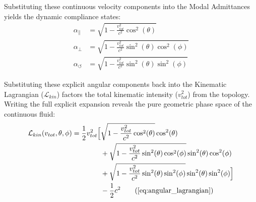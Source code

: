 \documentclass[11pt, a4paper]{article}
\begin{document}
Substituting these continuous velocity components into the Modal Admittances yields the dynamic compliance states:
\begin{align}
    \alpha_{\parallel} &= \sqrt{1 - \frac{v_{tot}^2}{c^2} \cos^2(\theta)} \nonumber \\
    \alpha_{\perp} &= \sqrt{1 - \frac{v_{tot}^2}{c^2} \sin^2(\theta)\cos^2(\phi)} \nonumber \\
    \alpha_{\circlearrowleft} &= \sqrt{1 - \frac{v_{tot}^2}{c^2} \sin^2(\theta)\sin^2(\phi)} \nonumber
\end{align}

Substituting these explicit angular components back into the Kinematic Lagrangian ($\mathcal{L}_{kin}$) factors the total kinematic intensity ($v_{tot}^2$) from the topology. Writing the full explicit expansion reveals the pure geometric phase space of the continuous fluid:
\begin{align}
    \mathcal{L}_{kin}(v_{tot}, \theta, \phi) = \frac{1}{2} v_{tot}^2 \Big[ &\sqrt{1 - \frac{v_{tot}^2}{c^2} \cos^2(\theta)} \cos^2(\theta) \nonumber \\
    &+ \sqrt{1 - \frac{v_{tot}^2}{c^2} \sin^2(\theta)\cos^2(\phi)} \sin^2(\theta)\cos^2(\phi) \nonumber \\
    &+ \sqrt{1 - \frac{v_{tot}^2}{c^2} \sin^2(\theta)\sin^2(\phi)} \sin^2(\theta)\sin^2(\phi) \Big] \nonumber \\
    &- \frac{1}{2} c^2 \tag{\ref{eq:angular_lagrangian}}
\end{align}
\end{document}
